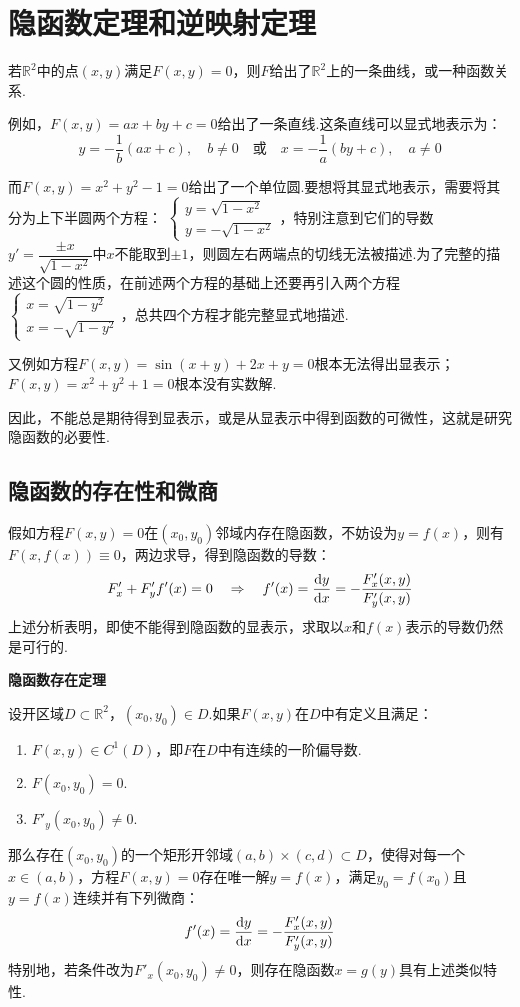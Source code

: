 \section{隐函数定理和逆映射定理}
若$\mathbb{R}^2$中的点$(x,y)$满足$F(x,y) = 0$，则$F$给出了$\mathbb{R}^2$上的一条曲线，或一种函数关系.

例如，$F(x,y) = ax + by + c = 0$给出了一条直线.这条直线可以显式地表示为：
\[y = -\frac{1}{b}(ax + c),\quad b \neq 0 \quad\text{或}\quad x = -\frac{1}{a}(by + c),\quad a \neq 0\]

而$F(x,y) = x^2 + y^2 - 1 = 0$给出了一个单位圆.要想将其显式地表示，需要将其分为上下半圆两个方程：
$\begin{cases}
    y = \sqrt{1-x^2} \\
    y = -\sqrt{1-x^2}
\end{cases}$，特别注意到它们的导数$y' = \dfrac{\pm x}{\sqrt{1-x^2}}$中$x$不能取到$\pm 1$，则圆左右两端点的切线无法被描述.为了完整的描述这个圆的性质，在前述两个方程的基础上还要再引入两个方程$\begin{cases}
    x = \sqrt{1-y^2} \\
    x = -\sqrt{1-y^2}
\end{cases}$，总共四个方程才能完整显式地描述.

又例如方程$F(x,y) = \sin(x+y) + 2x + y = 0$根本无法得出显表示；$F(x,y) = x^2 + y^2 + 1 = 0$根本没有实数解.

因此，不能总是期待得到显表示，或是从显表示中得到函数的可微性，这就是研究隐函数的必要性.

\subsection{隐函数的存在性和微商}
假如方程$F(x,y) = 0$在$(x_0,y_0)$邻域内存在隐函数，不妨设为$y = f(x)$，则有$F(x,f(x)) \equiv 0$，两边求导，得到隐函数的导数：
\[F'_x + F'_y f'(x) = 0 \quad\Rightarrow\quad f'(x) = \dv{y}{x} = -\frac{F'_x(x,y)}{F'_y(x,y)}\]
上述分析表明，即使不能得到隐函数的显表示，求取以$x$和$f(x)$表示的导数仍然是可行的.

\begin{theorem}
    \textbf{隐函数存在定理}
    \label{thm:ExistenceOfImplicitFunctions}

    设开区域$D \subset \mathbb{R}^2$，$(x_0,y_0) \in D$.如果$F(x,y)$在$D$中有定义且满足：
    \begin{enumerate}[circ]
        \item $F(x,y) \in C^1(D)$，即$F$在$D$中有连续的一阶偏导数.
        \item $F(x_0,y_0) = 0$.
        \item $F'_y(x_0,y_0) \neq 0$.
    \end{enumerate}
    那么存在$(x_0,y_0)$的一个矩形开邻域$(a,b) \times (c,d) \subset D$，使得对每一个$x \in (a,b)$，方程$F(x,y) = 0$存在唯一解$y = f(x)$，满足$y_0 = f(x_0)$且$y = f(x)$连续并有下列微商：
    \[f'(x) = \dv{y}{x} = -\frac{F'_x(x,y)}{F'_y(x,y)}\]
    特别地，若条件改为$F'_x(x_0,y_0) \neq 0$，则存在隐函数$x = g(y)$具有上述类似特性.
\end{theorem}

